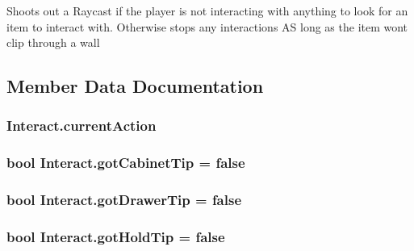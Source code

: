 Shoots out a Raycast if the player is not interacting with anything to look for an item to interact with. Otherwise stops any interactions AS long as the item won\textquotesingle{}t clip through a wall 



\subsection{Member Data Documentation}
\subsubsection[{\texorpdfstring{current\+Action}{currentAction}}]{ Interact.\+current\+Action}\hypertarget{class_interact_afddad7ecedf48b20c8b01b0f37cc0c25}{}\label{class_interact_afddad7ecedf48b20c8b01b0f37cc0c25}
\subsubsection[{\texorpdfstring{got\+Cabinet\+Tip}{gotCabinetTip}}]{\setlength{\rightskip}{0pt plus 5cm}bool Interact.\+got\+Cabinet\+Tip = false}\hypertarget{class_interact_abd10e3a65acb03851b3f135be25f8477}{}\label{class_interact_abd10e3a65acb03851b3f135be25f8477}
\subsubsection[{\texorpdfstring{got\+Drawer\+Tip}{gotDrawerTip}}]{\setlength{\rightskip}{0pt plus 5cm}bool Interact.\+got\+Drawer\+Tip = false}\hypertarget{class_interact_a49811c6723bd579aad39dcbaba8906c7}{}\label{class_interact_a49811c6723bd579aad39dcbaba8906c7}
\subsubsection[{\texorpdfstring{got\+Hold\+Tip}{gotHoldTip}}]{\setlength{\rightskip}{0pt plus 5cm}bool Interact.\+got\+Hold\+Tip = false}\hypertarget{class_interact_a612beec121bde3a51b455c12c992c04d}{}\label{class_interact_a612beec121bde3a51b455c12c992c04d}

